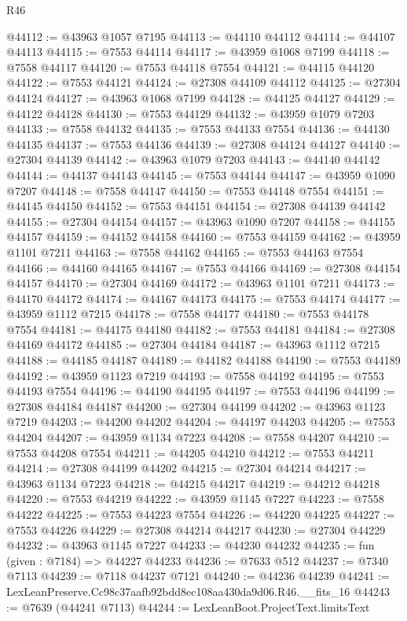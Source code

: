 \begin{lexlean}{R46}
\begin{coremodule}
@44112 := @43963 @1057 @7195
@44113 := @44110 @44112
@44114 := @44107 @44113
@44115 := @7553 @44114
@44117 := @43959 @1068 @7199
@44118 := @7558 @44117
@44120 := @7553 @44118 @7554
@44121 := @44115 @44120
@44122 := @7553 @44121
@44124 := @27308 @44109 @44112
@44125 := @27304 @44124
@44127 := @43963 @1068 @7199
@44128 := @44125 @44127
@44129 := @44122 @44128
@44130 := @7553 @44129
@44132 := @43959 @1079 @7203
@44133 := @7558 @44132
@44135 := @7553 @44133 @7554
@44136 := @44130 @44135
@44137 := @7553 @44136
@44139 := @27308 @44124 @44127
@44140 := @27304 @44139
@44142 := @43963 @1079 @7203
@44143 := @44140 @44142
@44144 := @44137 @44143
@44145 := @7553 @44144
@44147 := @43959 @1090 @7207
@44148 := @7558 @44147
@44150 := @7553 @44148 @7554
@44151 := @44145 @44150
@44152 := @7553 @44151
@44154 := @27308 @44139 @44142
@44155 := @27304 @44154
@44157 := @43963 @1090 @7207
@44158 := @44155 @44157
@44159 := @44152 @44158
@44160 := @7553 @44159
@44162 := @43959 @1101 @7211
@44163 := @7558 @44162
@44165 := @7553 @44163 @7554
@44166 := @44160 @44165
@44167 := @7553 @44166
@44169 := @27308 @44154 @44157
@44170 := @27304 @44169
@44172 := @43963 @1101 @7211
@44173 := @44170 @44172
@44174 := @44167 @44173
@44175 := @7553 @44174
@44177 := @43959 @1112 @7215
@44178 := @7558 @44177
@44180 := @7553 @44178 @7554
@44181 := @44175 @44180
@44182 := @7553 @44181
@44184 := @27308 @44169 @44172
@44185 := @27304 @44184
@44187 := @43963 @1112 @7215
@44188 := @44185 @44187
@44189 := @44182 @44188
@44190 := @7553 @44189
@44192 := @43959 @1123 @7219
@44193 := @7558 @44192
@44195 := @7553 @44193 @7554
@44196 := @44190 @44195
@44197 := @7553 @44196
@44199 := @27308 @44184 @44187
@44200 := @27304 @44199
@44202 := @43963 @1123 @7219
@44203 := @44200 @44202
@44204 := @44197 @44203
@44205 := @7553 @44204
@44207 := @43959 @1134 @7223
@44208 := @7558 @44207
@44210 := @7553 @44208 @7554
@44211 := @44205 @44210
@44212 := @7553 @44211
@44214 := @27308 @44199 @44202
@44215 := @27304 @44214
@44217 := @43963 @1134 @7223
@44218 := @44215 @44217
@44219 := @44212 @44218
@44220 := @7553 @44219
@44222 := @43959 @1145 @7227
@44223 := @7558 @44222
@44225 := @7553 @44223 @7554
@44226 := @44220 @44225
@44227 := @7553 @44226
@44229 := @27308 @44214 @44217
@44230 := @27304 @44229
@44232 := @43963 @1145 @7227
@44233 := @44230 @44232
@44235 := fun (given : @7184) => @44227 @44233
@44236 := @7633 @512
@44237 := @7340 @7113
@44239 := @7118 @44237 @7121
@44240 := @44236 @44239
@44241 := LexLeanPreserve.Cc98c37aafb92bdd8ec108aa430da9d06.R46.__fits_16
@44243 := @7639 (@44241 @7113)
@44244 := LexLeanBoot.ProjectText.limitsText

\end{coremodule}
\end{lexlean}
